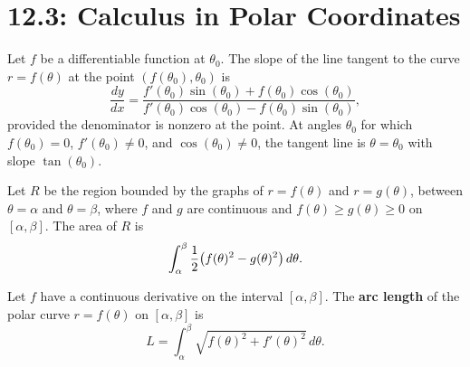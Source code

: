 \documentclass[../mathNotesPreamble]{subfiles}
\begin{document}
  \section{12.3: Calculus in Polar Coordinates}

  \begin{thmBox*}
    Let $f$ be a differentiable function at $\theta_0$. The slope of the line tangent to the curve $r=f(\theta)$ at the point $(f(\theta_0),\theta_0)$ is
      \[\frac{dy}{dx}=\frac{f'(\theta_0)\sin(\theta_0)+f(\theta_0)\cos(\theta_0)}{f'(\theta_0)\cos(\theta_0)-f(\theta_0)\sin(\theta_0)},\]
    provided the denominator is nonzero at the point. At angles $\theta_0$ for which $f(\theta_0)=0$, $f'(\theta_0)\neq0$, and $\cos(\theta_0)\neq 0$, the tangent line is $\theta=\theta_0$ with slope $\tan(\theta_0)$.
  \end{thmBox*}

  \begin{defn*}
    Let $R$ be the region bounded by the graphs of $r=f(\theta)$ and $r=g(\theta)$, between $\theta=\alpha$ and $\theta=\beta$, where $f$ and $g$ are continuous and $f(\theta)\geq g(\theta)\geq 0$ on $[\alpha,\beta]$. The area of $R$ is
      \[\int_\alpha^\beta \frac{1}{2}{\left(f(\theta)^2-g(\theta)^2\right)}\,d\theta.\]
  \end{defn*}

  \begin{thmBox*}
    Let $f$ have a continuous derivative on the interval $[\alpha,\beta]$. The \textbf{arc length} of the polar curve $r=f(\theta)$ on $[\alpha,\beta]$ is
      \[L=\int_\alpha^\beta \sqrt{f(\theta)^2+f'(\theta)^2}\,d\theta.\]
  \end{thmBox*}
\end{document}
